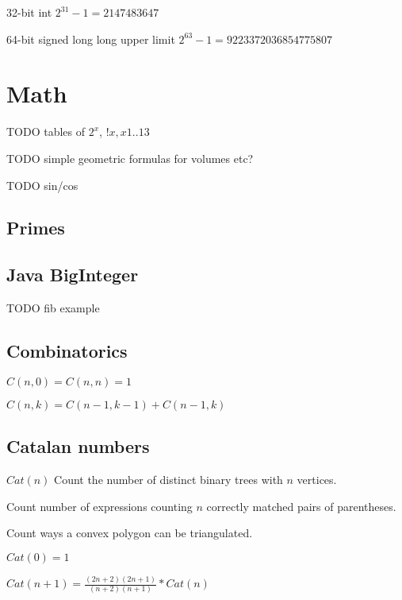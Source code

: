 \documentclass[twocolumn,8pt]{article}
\begin{document}
32-bit int $2^{31} - 1 = 2147483647$

64-bit signed long long upper limit $2^{63} - 1 = 9223372036854775807$


\section{Math}

TODO tables of $2^x$, $!x, x 1..13$

TODO simple geometric formulas for volumes etc?

TODO sin/cos



\subsection{Primes}



\subsection{Java BigInteger}

TODO fib example



\subsection{Combinatorics}

$C(n,0) = C(n,n) = 1$

$C(n,k) = C(n - 1, k - 1) + C(n - 1, k)$

\subsection{Catalan numbers}

\begin{enumerate*}
    \item $Cat(n)$ Count the number of distinct binary trees with $n$ vertices.
    \item Count number of expressions counting $n$ correctly matched pairs of parentheses.
    \item Count ways a convex polygon can be triangulated.
\end{enumerate*}

$Cat(0) = 1$

$Cat(n + 1) = \frac{(2n + 2)(2n + 1)}{(n + 2)(n + 1)} * Cat(n)$
\end{document}
